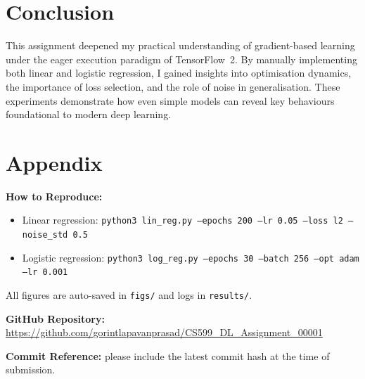 \documentclass{article}
\begin{document}
\section{Conclusion}
This assignment deepened my practical understanding of gradient-based learning under the eager execution paradigm of TensorFlow~2. By manually implementing both linear and logistic regression, I gained insights into optimisation dynamics, the importance of loss selection, and the role of noise in generalisation. These experiments demonstrate how even simple models can reveal key behaviours foundational to modern deep learning.

\section*{Appendix}
\textbf{How to Reproduce:}
\begin{itemize}
    \item Linear regression: \texttt{python3 lin\_reg.py --epochs 200 --lr 0.05 --loss l2 --noise\_std 0.5}
    \item Logistic regression: \texttt{python3 log\_reg.py --epochs 30 --batch 256 --opt adam --lr 0.001}
\end{itemize}
All figures are auto-saved in \texttt{figs/} and logs in \texttt{results/}.  

\textbf{GitHub Repository:} \\
\url{https://github.com/gorintlapavanprasad/CS599_DL_Assignment_00001}

\textbf{Commit Reference:} please include the latest commit hash at the time of submission.
\end{document}
